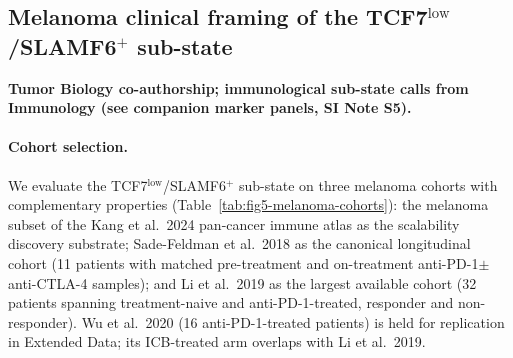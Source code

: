 

\subsection{Melanoma clinical framing of the TCF7$^{\text{low}}$/SLAMF6$^{+}$ sub-state}
\label{sec:fig5-melanoma-clinical}

\textbf{Tumor Biology co-authorship; immunological sub-state calls from Immunology (see companion marker panels, SI Note S5).}

\paragraph{Cohort selection.}
We evaluate the TCF7$^{\text{low}}$/SLAMF6$^{+}$ sub-state on three melanoma cohorts with complementary properties (Table~\ref{tab:fig5-melanoma-cohorts}): the melanoma subset of the Kang et al.\ 2024 pan-cancer immune atlas \citep{Kang2024PanCancerImmune} as the scalability discovery substrate; Sade-Feldman et al.\ 2018 \citep{Sade-Feldman2018Cell} as the canonical longitudinal cohort (11 patients with matched pre-treatment and on-treatment anti-PD-1$\pm$anti-CTLA-4 samples); and Li et al.\ 2019 \citep{Li2019Cell} as the largest available cohort (32 patients spanning treatment-naive and anti-PD-1-treated, responder and non-responder). Wu et al.\ 2020 \citep{Wu2020NatCommun} (16 anti-PD-1-treated patients) is held for replication in Extended Data; its ICB-treated arm overlaps with Li et al.\ 2019.

